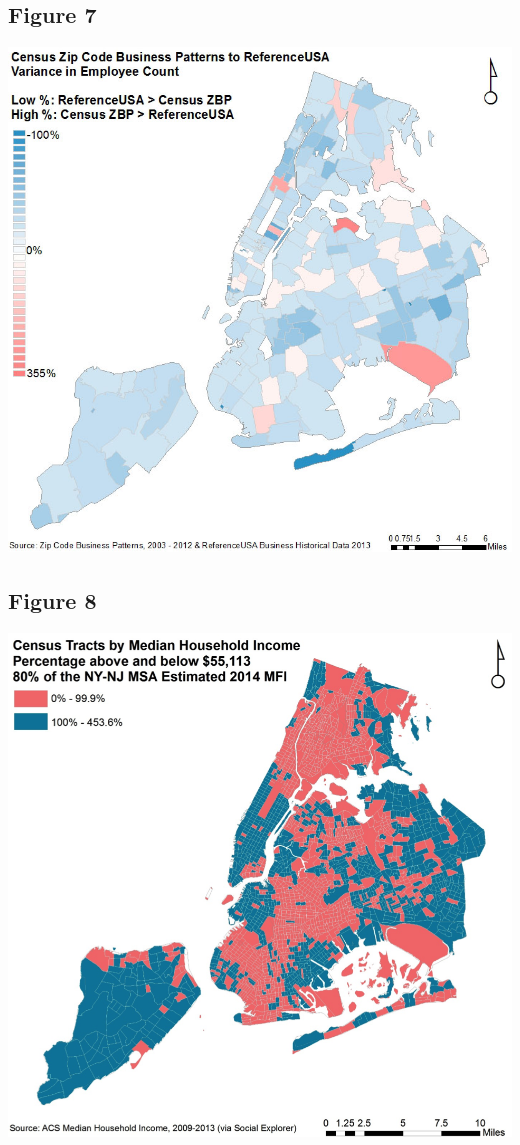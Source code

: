 \documentclass[article, 11pt]{article} %
\begin{document}
\subsection*{Figure 7}
\includegraphics[width=1.0\textwidth]{7}
\pagebreak
\subsection*{Figure 8}
\includegraphics[width=1.0\textwidth]{8}
\pagebreak
\end{document}
